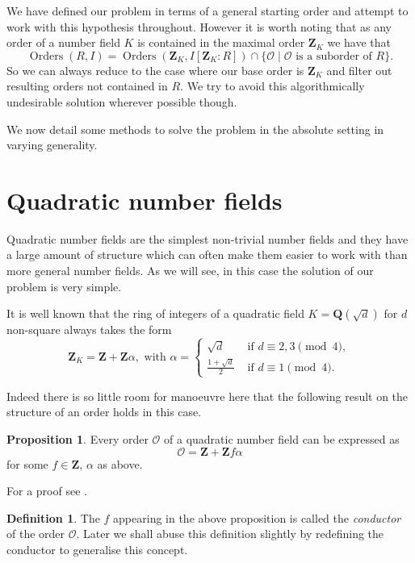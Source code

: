 \documentclass[12pt,a4paper,abstracton,bibtotoc]{scrreprt}
\theoremstyle{definition}
\newtheorem{prop}{Proposition}
\newtheorem{defn}{Definition}
\newcommand{\QQ}{\mathbf{Q}}
\newcommand{\ZZ}{\mathbf{Z}}
\renewcommand{\O}{\mathcal{O}}
\DeclareMathOperator{\Orders}{Orders}
\begin{document}
\minisec{}
We have defined our problem in terms of a general starting order and attempt to work with this hypothesis throughout.
However it is worth noting that as any order of a number field $K$ is contained in the maximal order $\ZZ_K$ we have that
\[
\Orders(R,I) = \Orders(\ZZ_K, I[\ZZ_K : R]) \cap \{\O\mid \O \text{ is a suborder of } R\}.
\]
So we can always reduce to the case where our base order is $\ZZ_K$ and filter out resulting orders not contained in $R$.
We try to avoid this algorithmically undesirable solution wherever possible though.

We now detail some methods to solve the problem in the absolute setting in varying generality.

\section{Quadratic number fields}

Quadratic number fields are the simplest non-trivial number fields and they have a large amount of structure which can often make them easier to work with than more general number fields.
As we will see, in this case the solution of our problem is very simple.

It is well known \cite{lang} that the ring of integers of a quadratic field $K = \QQ(\sqrt{d})$ for $d$ non-square always takes the form
\[\ZZ_K = \ZZ + \ZZ\alpha,\text{ with } \alpha =\begin{cases}
\sqrt{d}&\text{ if $d\equiv 2,3\pmod{4}$},\\
\frac{1+\sqrt{d}}{2}&\text{ if $d\equiv 1\pmod{4}$}.
\end{cases}\]

Indeed there is so little room for manoeuvre here that the following result on the structure of an order holds in this case.

\begin{prop}
\label{prop:quadord}
Every order $\O$ of a quadratic number field can be expressed as
\[
\O = \ZZ + \ZZ f\alpha
\]
for some $f\in \ZZ$, $\alpha$ as above.
\end{prop}

For a proof see \cite[pp. 133--134]{cox}.

\begin{defn}
The $f$ appearing in the above proposition is called the \emph{conductor} of the order $\O$.
Later we shall abuse this definition slightly by redefining the conductor to generalise this concept.
\end{defn}
\end{document}
